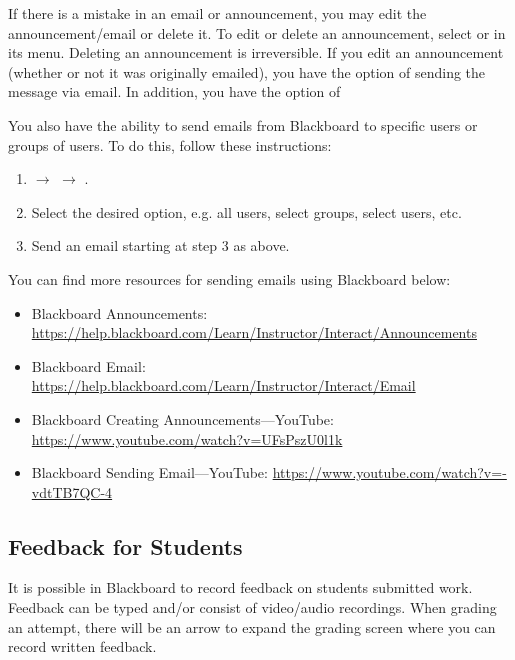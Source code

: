 If there is a mistake in an email or announcement, you may edit the announcement/email or delete it. To edit or delete an announcement, select  or  in its menu. Deleting an announcement is irreversible. If you edit an announcement (whether or not it was originally emailed), you have the option of sending the message via email. In addition, you have the option of 

You also have the ability to send emails from Blackboard to specific users or groups of users. To do this, follow these instructions:

	\begin{enumerate}[1.]
	\item {} $\to$  $\to$ .
	\item Select the desired option, e.g. all users, select groups, select users, etc. 
	\item Send an email starting at step 3 as above. 
	\end{enumerate} 

You can find more resources for sending emails using Blackboard below:

	\begin{itemize}
	\item Blackboard Announcements: \url{https://help.blackboard.com/Learn/Instructor/Interact/Announcements}
	\item Blackboard Email: \url{https://help.blackboard.com/Learn/Instructor/Interact/Email}
	\item Blackboard Creating Announcements---YouTube: \url{https://www.youtube.com/watch?v=UFsPszU0l1k}
	\item Blackboard Sending Email---YouTube: \url{https://www.youtube.com/watch?v=-vdtTB7QC-4}
	\end{itemize}





\subsection{Feedback for Students}

It is possible in Blackboard to record feedback on students submitted work. Feedback can be typed and/or consist of video/audio recordings. When grading an attempt, there will be an arrow to expand the grading screen where you can record written feedback. 

